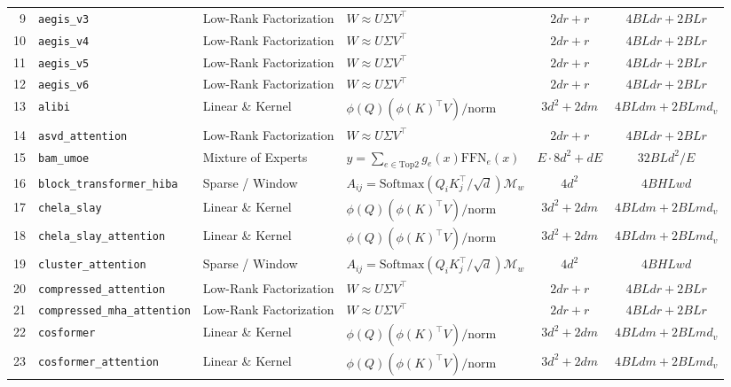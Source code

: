 \begin{center}
\begin{longtable}{rlllcc}
9 & \texttt{aegis\_v3} & Low-Rank Factorization & $W \approx U \Sigma V^\top$ & $2 d r + r$ & $4 B L d r + 2 B L r$ \\
10 & \texttt{aegis\_v4} & Low-Rank Factorization & $W \approx U \Sigma V^\top$ & $2 d r + r$ & $4 B L d r + 2 B L r$ \\
11 & \texttt{aegis\_v5} & Low-Rank Factorization & $W \approx U \Sigma V^\top$ & $2 d r + r$ & $4 B L d r + 2 B L r$ \\
12 & \texttt{aegis\_v6} & Low-Rank Factorization & $W \approx U \Sigma V^\top$ & $2 d r + r$ & $4 B L d r + 2 B L r$ \\
13 & \texttt{alibi} & Linear \& Kernel & $\phi(Q)(\phi(K)^\top V) / \text{norm}$ & $3 d^2 + 2 d m$ & $4 B L d m + 2 B L m d_v$ \\
14 & \texttt{asvd\_attention} & Low-Rank Factorization & $W \approx U \Sigma V^\top$ & $2 d r + r$ & $4 B L d r + 2 B L r$ \\
15 & \texttt{bam\_umoe} & Mixture of Experts & $y = \sum_{e \in \text{Top2}} g_e(x) \text{FFN}_e(x)$ & $E \cdot 8 d^2 + d E$ & $32 B L d^2 / E$ \\
16 & \texttt{block\_transformer\_hiba} & Sparse / Window & $A_{ij} = \text{Softmax}(Q_i K_j^\top / \sqrt{d}) \mathcal{M}_w$ & $4 d^2$ & $4 B H L w d$ \\
17 & \texttt{chela\_slay} & Linear \& Kernel & $\phi(Q)(\phi(K)^\top V) / \text{norm}$ & $3 d^2 + 2 d m$ & $4 B L d m + 2 B L m d_v$ \\
18 & \texttt{chela\_slay\_attention} & Linear \& Kernel & $\phi(Q)(\phi(K)^\top V) / \text{norm}$ & $3 d^2 + 2 d m$ & $4 B L d m + 2 B L m d_v$ \\
19 & \texttt{cluster\_attention} & Sparse / Window & $A_{ij} = \text{Softmax}(Q_i K_j^\top / \sqrt{d}) \mathcal{M}_w$ & $4 d^2$ & $4 B H L w d$ \\
20 & \texttt{compressed\_attention} & Low-Rank Factorization & $W \approx U \Sigma V^\top$ & $2 d r + r$ & $4 B L d r + 2 B L r$ \\
21 & \texttt{compressed\_mha\_attention} & Low-Rank Factorization & $W \approx U \Sigma V^\top$ & $2 d r + r$ & $4 B L d r + 2 B L r$ \\
22 & \texttt{cosformer} & Linear \& Kernel & $\phi(Q)(\phi(K)^\top V) / \text{norm}$ & $3 d^2 + 2 d m$ & $4 B L d m + 2 B L m d_v$ \\
23 & \texttt{cosformer\_attention} & Linear \& Kernel & $\phi(Q)(\phi(K)^\top V) / \text{norm}$ & $3 d^2 + 2 d m$ & $4 B L d m + 2 B L m d_v$ \\

\end{longtable}
\end{center}
